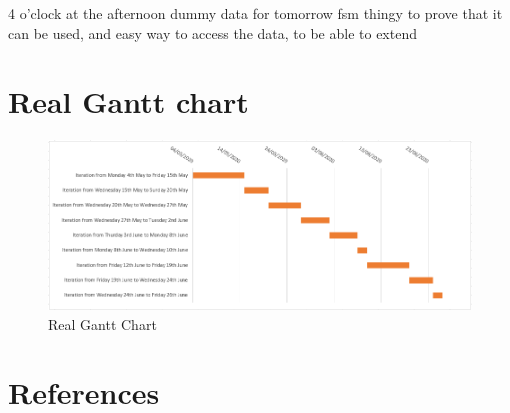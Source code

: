 \documentclass[a4paper, 12pt]{article}
\begin{document}
\begin{appendix}
    4 o'clock at the afternoon
    dummy data for tomorrow
    fsm thingy
    to prove that it can be used, and easy way to access the data, to be able to extend
    \newpage
    \section{Real Gantt chart}
    \begin{figure}[h]
        \centering
        \includegraphics[scale = 0.6]{images/gantt.png}
        \caption{Real Gantt Chart}
    \end{figure}
\end{appendix}

\newpage
\section{References}
\nocite{*}
\printbibliography[heading=subbibintoc,type=article,title={Bibliography}]
\printbibliography[heading=subbibintoc,type=misc,title={Webography}]
\end{document}
